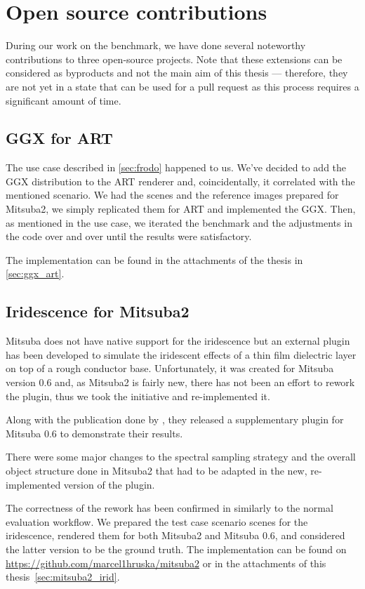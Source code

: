 \section{Open source contributions}

During our work on the benchmark, we have done several noteworthy contributions to three open-source projects. Note that these extensions can be considered as byproducts and not the main aim of this thesis --- therefore, they are not yet in a state that can be used for a pull request as this process requires a significant amount of time.

\subsection{GGX for ART}

The use case described in \autoref{sec:frodo} happened to us. We've decided to add the GGX distribution to the ART renderer and, coincidentally, it correlated with the mentioned scenario. We had the scenes and the reference images prepared for Mitsuba2, we simply replicated them for ART and implemented the GGX. Then, as mentioned in the use case, we iterated the benchmark and the adjustments in the code over and over until the results were satisfactory.

The implementation can be found in the attachments of the thesis in \autoref{sec:ggx_art}.

\subsection{Iridescence for Mitsuba2}

Mitsuba does not have native support for the iridescence but an external plugin has been developed to simulate the iridescent effects of a thin film dielectric layer on top of a rough conductor base. Unfortunately, it was created for Mitsuba version 0.6 and, as Mitsuba2 is fairly new, there has not been an effort to rework the plugin, thus we took the initiative and re-implemented it.

Along with the publication done by \citet{belcour2017practical}, they released a supplementary plugin for Mitsuba 0.6 to demonstrate their results.

There were some major changes to the spectral sampling strategy and the overall object structure done in Mitsuba2 that had to be adapted in the new, re-implemented version of the plugin.

The correctness of the rework has been confirmed in similarly to the normal evaluation workflow. We prepared the test case scenario scenes for the iridescence, rendered them for both Mitsuba2 and Mitsuba 0.6, and considered the latter version to be the ground truth. The implementation can be found on \url{https://github.com/marcel1hruska/mitsuba2} or in the attachments of this thesis~\ref{sec:mitsuba2_irid}.

